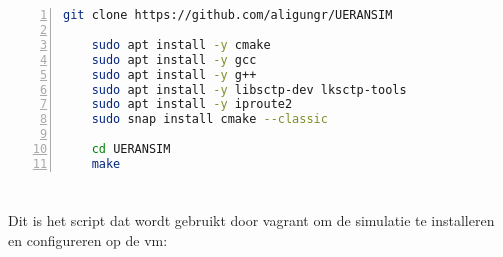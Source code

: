 \section{}
\begin{lstlisting}[basicstyle=\small, frame=single, breaklines=true, postbreak=\mbox{\textcolor{red}{$\hookrightarrow$}\space}, escapeinside ={\%,}, escapechar={!}, numbers=left, language=sh, caption=Installatie van web-interface]
    git clone https://github.com/aligungr/UERANSIM

    sudo apt install -y cmake
    sudo apt install -y gcc
    sudo apt install -y g++
    sudo apt install -y libsctp-dev lksctp-tools
    sudo apt install -y iproute2
    sudo snap install cmake --classic

    cd UERANSIM
    make
\end{lstlisting}

\section{}
\label{sec:script}

Dit is het script dat wordt gebruikt door vagrant om de simulatie te installeren en configureren op de \gls{vm}:

